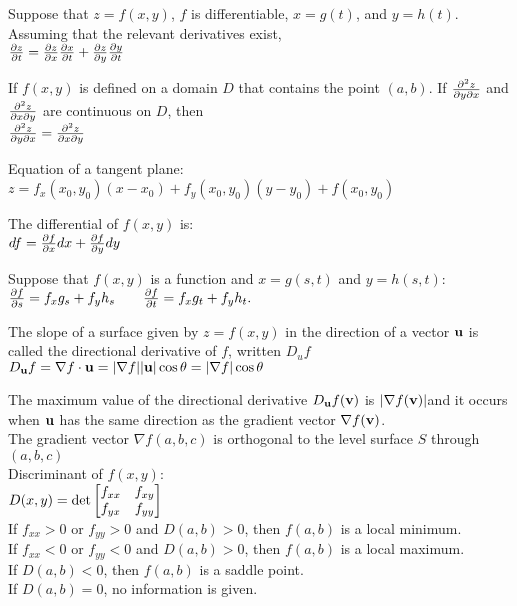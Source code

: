 \documentclass[12pt,landscape]{article}
\newcommand{\tab}{\hspace{.02\textwidth}}
\begin{document}
\begin{multicols}{3}
Suppose that $z=f(x,y)$, $f$ is differentiable, $x=g(t)$, and $y=h(t)$. Assuming that the relevant derivatives exist,\\
\tab $\pdv{z}{t} = \pdv{z}{x}\pdv{x}{t}+\pdv{z}{y}\pdv{y}{t}$

If $f(x,y)$ is defined on a domain $D$ that contains the point $(a,b)$. If $\pdv{z}{y}{x}$ and $\pdv{z}{x}{y}$ are continuous on $D$, then\\
\tab $\pdv{z}{y}{x} = \pdv{z}{x}{y}$
	
Equation of a tangent plane:\\
\tab $z=f_x(x_0,y_0)(x-x_0)+f_y(x_0,y_0)(y-y_0)+f(x_0,y_0)$

The differential of $f(x,y)$ is:\\
\tab $df = \pdv{f}{x}dx + \pdv{f}{y}dy$

Suppose that $f(x,y)$ is a function and $x=g(s,t)$ and $y=h(s,t)$:\\
\tab $\pdv{f}{s}=f_xg_s+f_yh_s\qquad \pdv{f}{t}=f_xg_t+f_yh_t.$

The slope of a surface given by $z=f(x,y)$ in the direction of a vector $\vb{u}$ is called the directional derivative of $f$, written $D_uf$\\
\tab $D_{\vb{u}}f=\nabla f\cdot \vb{u}=|\nabla f||\vb{u}|\cos\theta=
	|\nabla f|\cos\theta$

The maximum value of the directional derivative $D_{\vb{u}} f(\vb{v})$ is $|\nabla f(\vb{v})|$and it occurs when $\vb{u}$ has the same direction as the gradient vector $\nabla f(\vb{v})$.\\
\vspace{0.2cm}
The gradient vector $\nabla f(a,b,c)$ is orthogonal to the level surface $S$ through $(a,b,c)$\\
\vspace{0.2cm}
Discriminant of $f(x,y)$:\\
\tab $D(x,y) = \det\mqty[f_{xx}& f_{xy}\\f_{yx} & f_{yy} ]$\\
\vspace{0.2cm}
If $f_{xx} > 0$ or $f_{yy} > 0$ and $D(a,b) > 0$, then $f(a,b)$ is a local minimum.\\
If $f_{xx} < 0 $ or $f_{yy} < 0$ and $D(a,b) > 0$, then $f(a,b)$ is a local maximum.\\
If $D(a,b) < 0$, then $f(a,b)$ is a saddle point.\\
If $D(a,b) = 0$, no information is given.\\


\end{multicols}
\end{document}
